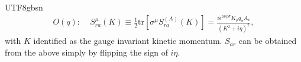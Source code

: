 \documentclass[11pt]{article}\def\baselinestretch{1.4}
\def\e{{\epsilon}}
\def\h{\eta}
\def\m{{\mu}}
\def\n{{\nu}}
\def\r{{\rho}}
\def\s{{\sigma}}
\newcommand{\tr}{\text{tr}}
\begin{document}
\begin{CJK}{UTF8}{gbsn}
\begin{align}
    O(q):&\; S_{ra}^{\m}(K)\equiv\frac{1}{2}\tr[\s^\m S_{ra}^{(A)}(K)] = \frac{i\e^{\m\n\r\s}K_\r q_\s A_\n}{({K}^2+i \eta)^2},
\end{align}
with $K$ identified as the gauge invariant kinetic momentum. $S_{ar}$ can be obtained from the above simply by flipping the sign of $i\h$.

\end{CJK}
\end{document}
